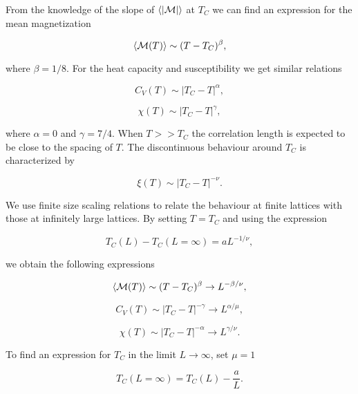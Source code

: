 \documentclass[11pt]{article}
\begin{document}
\begin{flushleft}
From the knowledge of the slope of $\braket{|\mathcal{M}|}$ at $T_C$ we can find an expression for the mean magnetization

\begin{equation}
\braket{\mathcal{M}(T)} \sim (T-T_C)^{\beta},
\end{equation}

where $\beta=1/8$. For the heat capacity and susceptibility we get similar relations

\begin{equation}
C_V(T) \sim |T_C - T|^{\alpha},
\end{equation}

\begin{equation}
\chi (T) \sim |T_C-T|^{\gamma},
\end{equation}

where $\alpha=0$ and $\gamma = 7/4$. When $T >>  T_C$ the correlation length is expected to be close to the spacing of $T$. The discontinuous behaviour around $T_C$ is characterized by

\begin{equation}
\xi(T) \sim |T_C -T|^{- \nu}.
\end{equation}

We use finite size scaling relations to relate the behaviour at finite lattices with those at infinitely large lattices. By setting $T=T_C$ and using the expression

\begin{equation*}\label{eq. 3}
T_C(L) - T_C(L= \infty) = aL^{-1/\nu},
\end{equation*}

we obtain the following expressions

\begin{equation}
\braket{\mathcal{M}(T)} \sim (T-T_C)^{\beta} \rightarrow L^{-\beta/\nu},
\end{equation}

\begin{equation}
C_V(T) \sim |T_C-T|^{-\gamma} \rightarrow L^{\alpha/\mu},
\end{equation}

\begin{equation*}
\chi (T) \sim |T_C - T|^{- \alpha} \rightarrow L^{\gamma/\nu}.
\end{equation*}

To find an expression for $T_C$ in the limit $L \rightarrow \infty$, set $\mu=1$

\begin{equation}\label{T at critical}
T_C(L = \infty ) = T_C(L) - \frac{a}{L}.
\end{equation}


\end{flushleft}
\end{document}
